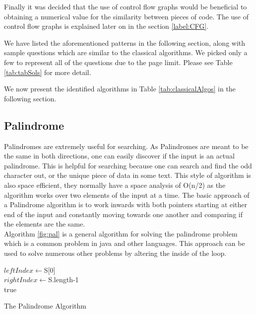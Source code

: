 \documentclass[10pt,twocolumn,hidelinks]{IEEEtran}
\begin{document}
\par Finally it was decided that the use of control flow graphs would be beneficial to obtaining a numerical value for the similarity between pieces of code. The use of control flow graphs is explained later on in the section \ref{label:CFG}.
\par We have listed the aforementioned patterns in the following section, along with sample questions which are similar to the classical algorithms. We picked only a few to represent all of the questions due to the page limit. Please see Table \ref{tab:tabSols} for more detail.
\par We now present the identified algorithms in Table \ref{tab:classicalAlgos} in the following section. 
\subsection{Palindrome}
Palindromes are extremely useful for searching. As Palindromes are meant to be the same in both directions, one can easily discover if the input is an actual palindrome. This is helpful for searching because one can search and find the odd character out, or the unique piece of data in some text. This style of algorithm is also space efficient, they normally have a space analysis of O(n/2) as the algorithm works over two elements of the input at a time. The basic approach of a Palindrome algorithm is to work inwards with both pointers starting at either end of the input and constantly moving towards one another and comparing if the elements are the same.\\  
Algorithm \ref{fig:pal} is a general algorithm for solving the palindrome problem which is a common problem in java and other languages. This approach can be used to solve numerous other problems by altering the inside of the loop.
\IncMargin{1em}
\begin{algorithm}
	\LinesNumbered
	$leftIndex  \longleftarrow $S[0]\\
	$rightIndex \longleftarrow $S.length-1\\
\Return true
\caption{The Palindrome Algorithm}
\label{fig:pal}
\end{algorithm}\DecMargin{1em}
\end{document}
